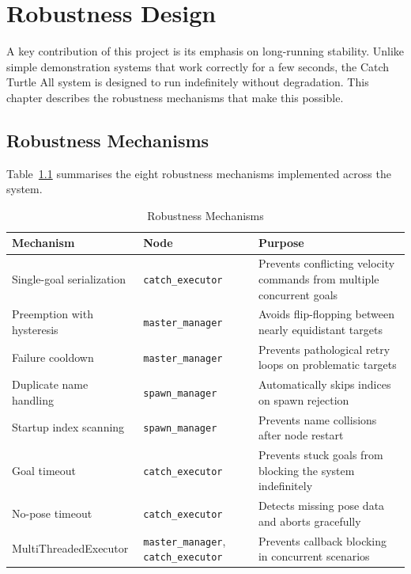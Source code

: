 \chapter{Robustness Design\label{chap:robustness}}

A key contribution of this project is its emphasis on long-running stability. Unlike simple demonstration systems that work correctly for a few seconds, the Catch Turtle All system is designed to run indefinitely without degradation. This chapter describes the robustness mechanisms that make this possible.

\section{Robustness Mechanisms}

Table~\ref{tab:robustness} summarises the eight robustness mechanisms implemented across the system.

\begin{table}[htbp]
\centering
\caption{Robustness Mechanisms}
\label{tab:robustness}
\begin{tabular}{p{3.5cm}p{3.5cm}p{6cm}}
\toprule
\textbf{Mechanism} & \textbf{Node} & \textbf{Purpose} \\
\midrule
Single-goal serialization & \texttt{catch\_executor} & Prevents conflicting velocity commands from multiple concurrent goals \\
Preemption with hysteresis & \texttt{master\_manager} & Avoids flip-flopping between nearly equidistant targets \\
Failure cooldown & \texttt{master\_manager} & Prevents pathological retry loops on problematic targets \\
Duplicate name handling & \texttt{spawn\_manager} & Automatically skips indices on spawn rejection \\
Startup index scanning & \texttt{spawn\_manager} & Prevents name collisions after node restart \\
Goal timeout & \texttt{catch\_executor} & Prevents stuck goals from blocking the system indefinitely \\
No-pose timeout & \texttt{catch\_executor} & Detects missing pose data and aborts gracefully \\
MultiThreadedExecutor & \texttt{master\_manager}, \texttt{catch\_executor} & Prevents callback blocking in concurrent scenarios \\
\bottomrule
\end{tabular}
\end{table}


